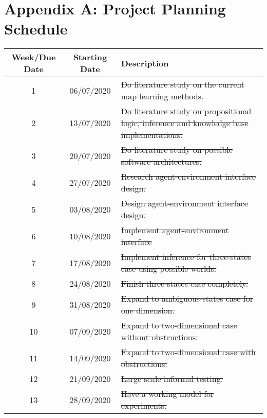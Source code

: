 \setcounter{table}{0}
\renewcommand{\thetable}{A.\arabic{table}}

\chapter{Appendix A:  Project Planning Schedule}

 \begin{table}[H]
  \begin{center}
    \begin{tabular}{|c|c|p{8cm}|} 
    \hline
      \textbf{Week/Due Date} & \textbf{Starting Date} & \textbf{Description}\\
      \hline
      \hline
      1 & 06/07/2020 & \sout{Do literature study on the current map learning methods.}\\ \hline
      
      2 & 13/07/2020 & \sout{Do literature study on propositional logic, 
      inference and knowledge base implementations.}\\ \hline
      
      3 & 20/07/2020 & \sout{Do literature study on possible software architectures.}\\ \hline
      
      4 & 27/07/2020 &  \sout{Research agent-environment interface design.} \\ \hline
      
      5  & 03/08/2020 & \sout{Design agent-environment interface design.}  \\ \hline
      
      6 & 10/08/2020 & \sout{Implement agent-environment interface}\\ \hline
      
      7 & 17/08/2020 & \sout{Implement inference for three-states case using possible worlds.} \\ \hline
      
      8 & 24/08/2020 & \sout{Finish three-states case completely.}\\ \hline
      
      9 & 31/08/2020 & \sout{Expand to ambiguous-states case for one dimension.}\\ \hline
      10 & 07/09/2020 & \sout{Expand to two-dimensional case without obstructions.}\\ \hline
      11 & 14/09/2020 & \sout{Expand to two-dimensional case with obstructions.}\\ \hline
      12 & 21/09/2020 & \sout{Large scale informal testing.}\\ \hline
      13 & 28/09/2020 & \sout{Have a working model for experiments.}\\ \hline


\end{tabular}
\end{center}
\end{table}
